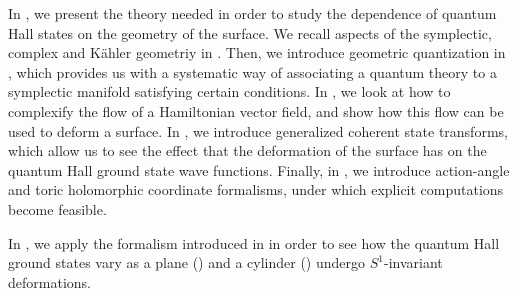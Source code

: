 \documentclass[notas.tex]{subfiles} 				%
\begin{document}
In , we present the theory needed in order to study the dependence of quantum Hall states on the geometry of the surface. We recall aspects of the symplectic, complex and Kähler geometriy in . Then, we introduce geometric quantization in , which provides us with a systematic way of associating a quantum theory to a symplectic manifold satisfying certain conditions. In , we look at how to complexify the flow of a Hamiltonian vector field, and show how this flow can be used to deform a surface. In , we introduce generalized coherent state transforms, which allow us to see the effect that the deformation of the surface has on the quantum Hall ground state wave functions. Finally, in , we introduce action-angle and toric holomorphic coordinate formalisms, under which explicit computations become feasible.

In , we apply the formalism introduced in  in order to see how the quantum Hall ground states vary as a plane () and a cylinder () undergo $S^1$-invariant deformations.
\end{document}

